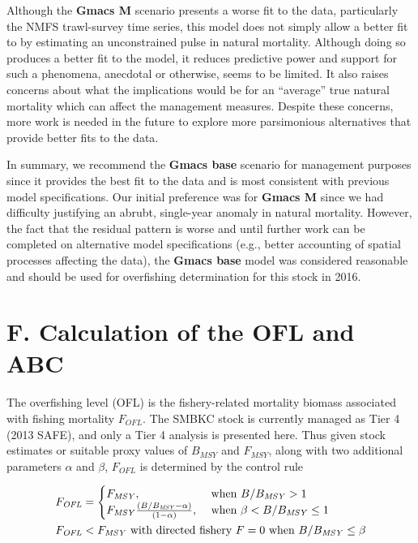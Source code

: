 \documentclass[]{article}
\begin{document}
Although the \textbf{Gmacs M} scenario presents a worse fit to the data,
particularly the NMFS trawl-survey time series, this model does not
simply allow a better fit to by estimating an unconstrained pulse in
natural mortality. Although doing so produces a better fit to the model,
it reduces predictive power and support for such a phenomena, anecdotal
or otherwise, seems to be limited. It also raises concerns about what
the implications would be for an ``average'' true natural mortality
which can affect the management measures. Despite these concerns, more
work is needed in the future to explore more parsimonious alternatives
that provide better fits to the data.

In summary, we recommend the \textbf{Gmacs base} scenario for management
purposes since it provides the best fit to the data and is most
consistent with previous model specifications. Our initial preference
was for \textbf{Gmacs M} since we had difficulty justifying an abrubt,
single-year anomaly in natural mortality. However, the fact that the
residual pattern is worse and until further work can be completed on
alternative model specifications (e.g., better accounting of spatial
processes affecting the data), the \textbf{Gmacs base} model was
considered reasonable and should be used for overfishing determination
for this stock in 2016.

\section{F. Calculation of the OFL and
ABC}\label{f.-calculation-of-the-ofl-and-abc}

The overfishing level (OFL) is the fishery-related mortality biomass
associated with fishing mortality \(F_\mathit{OFL}\). The SMBKC stock is
currently managed as Tier 4 (2013 SAFE), and only a Tier 4 analysis is
presented here. Thus given stock estimates or suitable proxy values of
\(B_\mathit{MSY}\) and \(F_\mathit{MSY}\), along with two additional
parameters \(\alpha\) and \(\beta\), \(F_\mathit{OFL}\) is determined by
the control rule

\begin{align}
    F_\mathit{OFL} &= 
    \begin{cases}
        F_\mathit{MSY}, &\text{ when } B/B_\mathit{MSY} > 1\\
        F_\mathit{MSY} \frac{\left( B/B_\mathit{MSY} - \alpha \right)}{(1 - \alpha)}, &\text{ when } \beta < B/B_\mathit{MSY} \le 1
    \end{cases}\\
    F_\mathit{OFL} &< F_\mathit{MSY} \text{ with directed fishery } F = 0 \text{ when } B/B_\mathit{MSY} \le \beta \notag
\end{align}
\end{document}
